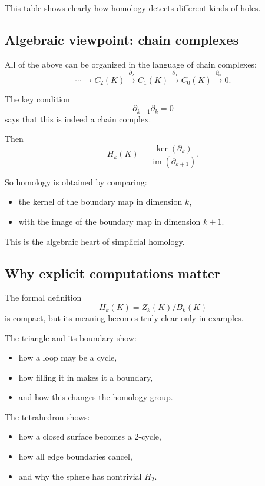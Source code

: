\documentclass[12pt,a4paper]{article}
\theoremstyle{notespace}
\begin{document}
This table shows clearly how homology detects different kinds of holes.

\subsection{Algebraic viewpoint: chain complexes}

All of the above can be organized in the language of chain complexes:
\[
\cdots \longrightarrow C_2(K)\xrightarrow{\partial_2} C_1(K)\xrightarrow{\partial_1} C_0(K)\xrightarrow{\partial_0} 0.
\]

The key condition
\[
\partial_{k-1}\partial_k=0
\]
says that this is indeed a chain complex.

Then
\[
H_k(K)=\frac{\ker(\partial_k)}{\operatorname{im}(\partial_{k+1})}.
\]

So homology is obtained by comparing:
\begin{itemize}
	\item the kernel of the boundary map in dimension \(k\),
	\item with the image of the boundary map in dimension \(k+1\).
\end{itemize}

This is the algebraic heart of simplicial homology.

\subsection{Why explicit computations matter}

The formal definition
\[
H_k(K)=Z_k(K)/B_k(K)
\]
is compact, but its meaning becomes truly clear only in examples.

The triangle and its boundary show:
\begin{itemize}
	\item how a loop may be a cycle,
	\item how filling it in makes it a boundary,
	\item and how this changes the homology group.
\end{itemize}

The tetrahedron shows:
\begin{itemize}
	\item how a closed surface becomes a \(2\)-cycle,
	\item how all edge boundaries cancel,
	\item and why the sphere has nontrivial \(H_2\).
\end{itemize}
\end{document}
